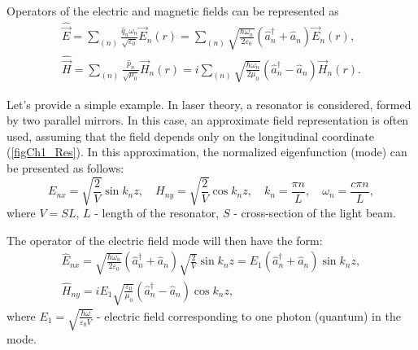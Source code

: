Operators of the electric and magnetic fields can be represented as
\begin{eqnarray}
\hat{\vec{E}} = \sum_{(n)}\frac{\hat{q}_n
  \omega_n}{\sqrt{\varepsilon_0}} \vec{E}_n\left(r\right) = 
\sum_{(n)}\sqrt{\frac{\hbar \omega_n}{2 \varepsilon_0}}
\left(\hat{a}_n^{\dag} + \hat{a}_n \right)
\vec{E}_n\left(r\right),
\nonumber \\
\hat{\vec{H}} = \sum_{(n)}\frac{\hat{p}_n}
{\sqrt{\mu_0}} \vec{H}_n\left(r\right) = 
i \sum_{(n)}\sqrt{\frac{\hbar \omega_n}{2 \mu_0}}
\left(\hat{a}_n^{\dag} - \hat{a}_n \right)
\vec{H}_n\left(r\right).
\end{eqnarray}

Let's provide a simple example. In laser theory, a resonator is considered, formed by two parallel mirrors. In this case, an approximate field representation is often used, assuming that the field depends only on the longitudinal coordinate (\autoref{figCh1_Res}). In this approximation, the normalized eigenfunction (mode) can be presented as follows:
\begin{equation}
E_{nx} = \sqrt{\frac{2}{V}} \sin k_n z,
\quad
H_{ny} = \sqrt{\frac{2}{V}} \cos k_n z,
\quad
k_n = \frac{\pi n}{L},
\quad
\omega_n = \frac{c \pi n}{L},
\end{equation}
where $V = SL$, $L$ - length of the resonator, $S$ - cross-section of the light beam.



The operator of the electric field mode will then have the form:
\begin{eqnarray}
\hat{E}_{nx} = 
\sqrt{\frac{\hbar \omega_n}{2 \varepsilon_0}}
\left(\hat{a}_n^{\dag} + \hat{a}_n \right)
\sqrt{\frac{2}{V}} \sin k_n z = 
E_1 \left(\hat{a}_n^{\dag} + \hat{a}_n \right) \sin k_n z, 
\nonumber \\
\hat{H}_{ny} = i E_1 \sqrt{\frac{\varepsilon_0}{\mu_0}}
\left(\hat{a}_n^{\dag} - \hat{a}_n \right) \cos k_n z,
\label{eqCh1_EH_simple}
\end{eqnarray}
where 
$E_1 = \sqrt{\frac{\hbar \omega}{\varepsilon_0 V}}$ - 
electric field corresponding to one photon (quantum) in
the mode. 